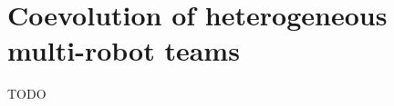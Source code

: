 \section{Coevolution of heterogeneous multi-robot teams \cite{knudson2010coevolution}}

\begin{frame}{TODO}

\end{frame}
